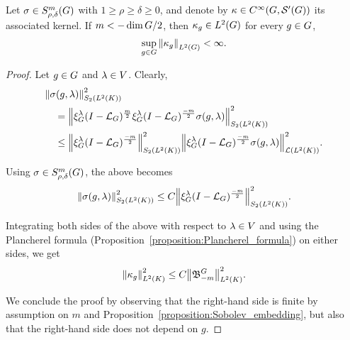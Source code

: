 \begin{proposition}
\label{proposition:L2_bound_on_the_kernel}
    Let $\sigma \in \SymbolClass m {\rho, \delta}$ with $1 \geq \rho \geq \delta \geq 0$,
    and denote by $\kappa \in \SmoothFunctions {\Group, \TemperedDistributions \Group}$ its associated kernel.
    If $m < -\dim \Group / 2$,
    then $\kappa_g \in \Lebesgue 2 \Group$ for every $g \in \Group$,
    \begin{align*}
        \sup_{g \in \Group} \norm [\Lebesgue 2 \Group] {\kappa_g} < \infty.
    \end{align*}
\end{proposition}
\begin{proof}
    Let $g \in \Group$ and $\lambda \in \VectorSpace$.
    Clearly,
    \begin{align*}
        &\norm [\SchattenClasses 2 {\Lebesgue 2 \CompactGroup}] {\sigma(g, \lambda)}^2\\
        &\quad= \norm [\SchattenClasses 2 {\Lebesgue 2 \CompactGroup}] {\Rep \lambda \BesselPotential m \Rep \lambda \BesselPotential {-m} \sigma(g, \lambda)}^2\\
        &\quad\leq
        \norm [\SchattenClasses 2 {\Lebesgue 2 \CompactGroup}] {\Rep \lambda \BesselPotential {-m}}^2
        \norm [\Lin {\Lebesgue 2 \CompactGroup}] {\Rep \lambda \BesselPotential {-m} \sigma(g, \lambda)}^2.
    \end{align*}

    Using $\sigma \in \SymbolClass m {\rho, \delta}$,
    the above becomes
    \begin{align*}
        \norm [\SchattenClasses 2 {\Lebesgue 2 \CompactGroup}] {\sigma(g, \lambda)}^2
        \leq C \norm [\SchattenClasses 2 {\Lebesgue 2 \CompactGroup}] {\Rep \lambda \BesselPotential {-m}}^2.
    \end{align*}

    Integrating both sides of the above with respect to $\lambda \in \VectorSpace$
    and using the Plancherel formula (Proposition~\ref{proposition:Plancherel_formula}) on either sides,
    we get
    \begin{align*}
        \norm [\Lebesgue 2 \CompactGroup] {\kappa_g}^2 \leq C \norm [\Lebesgue 2 \CompactGroup] {\BesselPotentialKernel {-m}}^2.
    \end{align*}

    We conclude the proof by observing that the right-hand side is finite by assumption on $m$ and Proposition~\ref{proposition:Sobolev_embedding},
    but also that the right-hand side does not depend on $g$.
\end{proof}


